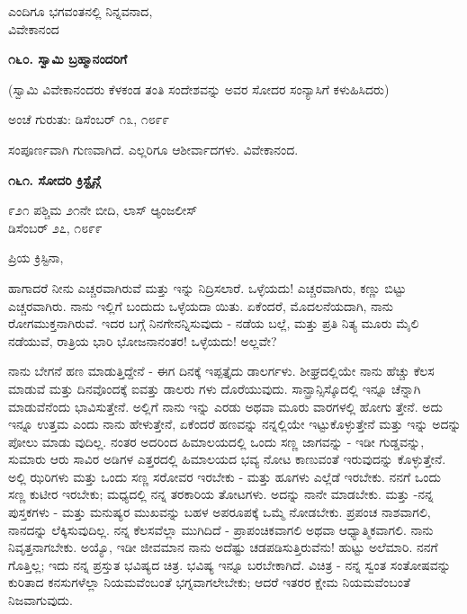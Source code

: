 \begin{flushright}
ಎಂದಿಗೂ ಭಗವಂತನಲ್ಲಿ ನಿನ್ನವನಾದ,\\ವಿವೇಕಾನಂದ
\end{flushright}

\begin{center}
\textbf{೧೬೦. ಸ್ವಾಮಿ ಬ್ರಹ್ಮಾನಂದರಿಗೆ}
\end{center}

\begin{center}
(ಸ್ವಾಮಿ ವಿವೇಕಾನಂದರು ಕೆಳಕಂಡ ತಂತಿ ಸಂದೇಶವನ್ನು ಅವರ ಸೋದರ ಸಂನ್ಯಾಸಿಗೆ ಕಳುಹಿಸಿದರು)
\end{center}

\begin{flushright}
ಅಂಚೆ ಗುರುತು: ಡಿಸೆಂಬರ್ ೧೩, ೧೮೯೯
\end{flushright}

ಸಂಪೂರ್ಣವಾಗಿ ಗುಣವಾಗಿದೆ. ಎಲ್ಲರಿಗೂ ಆಶೀರ್ವಾದಗಳು. ವಿವೇಕಾನಂದ.

\begin{center}
\textbf{೧೬೧. ಸೋದರಿ ಕ್ರಿಸ್ಟೈನ್ಗೆ}
\end{center}

\begin{flushright}
೯೨೧ ಪಶ್ಚಿಮ ೨೧ನೇ ಬೀದಿ, ಲಾಸ್ ಆ್ಯಂಜಲೀಸ್\\ಡಿಸೆಂಬರ್ ೨೭, ೧೮೯೯
\end{flushright}

ಪ್ರಿಯ ಕ್ರಿಸ್ಟಿನಾ,

ಹಾಗಾದರೆ ನೀನು ಎಚ್ಚರವಾಗಿರುವೆ ಮತ್ತು ಇನ್ನು ನಿದ್ರಿಸಲಾರೆ. ಒಳ್ಳೆಯದು! ಎಚ್ಚರವಾಗಿರು, ಕಣ್ಣು ಬಿಟ್ಟು ಎಚ್ಚರವಾಗಿರು. ನಾನು ಇಲ್ಲಿಗೆ ಬಂದುದು ಒಳ್ಳೆಯದಾ ಯಿತು. ಏಕೆಂದರೆ, ಮೊದಲನೆಯದಾಗಿ, ನಾನು ರೋಗಮುಕ್ತನಾಗಿರುವೆ. ಇದರ ಬಗ್ಗೆ ನಿನಗೇನನ್ನಿಸುವುದು - ನಡೆಯ ಬಲ್ಲೆ, ಮತ್ತು ಪ್ರತಿ ನಿತ್ಯ ಮೂರು ಮೈಲಿ ನಡೆಯುವೆ, ರಾತ್ರಿಯ ಭಾರಿ ಭೋಜನಾನಂತರ! ಒಳ್ಳೆಯದು! ಅಲ್ಲವೇ?

ನಾನು ಬೇಗನೆ ಹಣ ಮಾಡುತ್ತಿದ್ದೇನೆ - ಈಗ ದಿನಕ್ಕೆ ಇಪ್ಪತ್ತೈದು ಡಾಲರ್ಗಳು. ಶೀಘ್ರದಲ್ಲಿಯೇ ನಾನು ಹೆಚ್ಚು ಕೆಲಸ ಮಾಡುವೆ ಮತ್ತು ದಿನವೊಂದಕ್ಕೆ ಐವತ್ತು ಡಾಲರು ಗಳು ದೊರೆಯುವುದು. ಸಾನ್ಫ್ರಾನ್ಸಿಸ್ಕೊದಲ್ಲಿ ಇನ್ನೂ ಚೆನ್ನಾಗಿ ಮಾಡುವೆನೆಂದು ಭಾವಿಸುತ್ತೇನೆ. ಅಲ್ಲಿಗೆ ನಾನು ಇನ್ನು ಎರಡು ಅಥವಾ ಮೂರು ವಾರಗಳಲ್ಲಿ ಹೋಗು ತ್ತೇನೆ. ಅದು ಇನ್ನೂ ಉತ್ತಮ ಎಂದು ನಾನು ಹೇಳುತ್ತೇನೆ, ಏಕೆಂದರೆ ಹಣವನ್ನು ನನ್ನಲ್ಲಿಯೇ ಇಟ್ಟುಕೊಳ್ಳುತ್ತೇನೆ ಮತ್ತು ಇನ್ನು ಅದನ್ನು ಪೋಲು ಮಾಡು ವುದಿಲ್ಲ. ನಂತರ ಅದರಿಂದ ಹಿಮಾಲಯದಲ್ಲಿ ಒಂದು ಸಣ್ಣ ಜಾಗವನ್ನು - ಇಡೀ ಗುಡ್ಡವನ್ನು, ಸುಮಾರು ಆರು ಸಾವಿರ ಅಡಿಗಳ ಎತ್ತರದಲ್ಲಿ ಹಿಮಾಲಯದ ಭವ್ಯ ನೋಟ ಕಾಣುವಂತೆ ಇರುವುದನ್ನು ಕೊಳ್ಳುತ್ತೇನೆ. ಅಲ್ಲಿ ಝರಿಗಳು ಮತ್ತು ಒಂದು ಸಣ್ಣ ಸರೋವರ ಇರಬೇಕು - ಮತ್ತು ಹೂಗಳು ಎಲ್ಲೆಡೆ ಇರಬೇಕು. ನನಗೆ ಒಂದು ಸಣ್ಣ ಕುಟೀರ ಇರಬೇಕು; ಮಧ್ಯದಲ್ಲಿ ನನ್ನ ತರಕಾರಿಯ ತೋಟಗಳು. ಅದನ್ನು ನಾನೇ ಮಾಡಬೇಕು. ಮತ್ತು -ನನ್ನ ಪುಸ್ತಕಗಳು - ಮತ್ತು ಮನುಷ್ಯರ ಮುಖವನ್ನು ಬಹಳ ಅಪರೂಪಕ್ಕೆ ಒಮ್ಮೆ ನೋಡಬೇಕು. ಪ್ರಪಂಚ ನಾಶವಾಗಲಿ, ನಾನದನ್ನು ಲೆಕ್ಕಿಸುವುದಿಲ್ಲ. ನನ್ನ ಕೆಲಸವೆಲ್ಲಾ ಮುಗಿದಿದೆ - ಪ್ರಾಪಂಚಿಕವಾಗಲಿ ಅಥವಾ ಆಧ್ಯಾತ್ಮಿಕವಾಗಲಿ. ನಾನು ನಿವೃತ್ತನಾಗಬೇಕು. ಅಯ್ಯೊ, ಇಡೀ ಜೀವಮಾನ ನಾನು ಅದೆಷ್ಟು ಚಡಪಡಿಸುತ್ತಿರುವೆನು! ಹುಟ್ಟು ಅಲೆಮಾರಿ. ನನಗೆ ಗೊತ್ತಿಲ್ಲ; ಇದು ನನ್ನ ಪ್ರಸ್ತುತ ಭವಿಷ್ಯದ ಚಿತ್ರ. ಭವಿಷ್ಯ ಇನ್ನೂ ಬರಬೇಕಾಗಿದೆ. ವಿಚಿತ್ರ - ನನ್ನ ಸ್ವಂತ ಸಂತೋಷವನ್ನು ಕುರಿತಾದ ಕನಸುಗಳೆಲ್ಲಾ ನಿಯಮವೆಂಬಂತೆ ಭಗ್ನವಾಗಲೇಬೇಕು; ಆದರೆ ಇತರರ ಕ್ಷೇಮ ನಿಯಮವೆಂಬಂತೆ ನಿಜವಾಗುವುದು.

